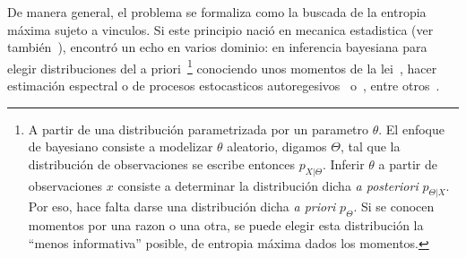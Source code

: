 De  manera general,  el problema  se formaliza  como la  buscada de  la entropia
m\'axima sujeto  a vinculos. Si  este principio naci\'o en  mecanica estadistica
(ver  tambi\'en~\cite{Jay57,  Jay57:2, Jay65}),  encontr\'o  un  echo en  varios
dominio:   en   inferencia   bayesiana   para  elegir   distribuciones   del   a
priori~\footnote{A partir  de una distribuci\'on parametrizada  por un parametro
  $\theta$.  El  enfoque de bayesiano  consiste a modelizar  $\theta$ aleatorio,
  digamos  $\Theta$,  tal que  la  distribuci\'on  de  observaciones se  escribe
  entonces  $p_{X|\Theta}$.   Inferir $\theta$  a  partir  de observaciones  $x$
  consiste   a   determinar  la   distribuci\'on   dicha   {\it  a   posteriori}
  $p_{\Theta|X}$.  Por  eso, hace  falta darse una  distribuci\'on dicha  {\it a
    priori} $p_\Theta$.   Si se conocen  momentos por una  razon o una  otra, se
  puede  elegir esta  distribuci\'on la  ``menos informativa''  posible,  \ie de
  entropia  m\'axima dados  los momentos.\label{foot:SZ:Prior}}  conociendo unos
momentos  de  la  lei~\cite{Rob07,  Jay68,  Jay82,  Csi91},  hacer  estimaci\'on
espectral  o de procesos  estocasticos autoregesivos~\cite{Bur67,  Bur75, Jay82}
o~\cite[cap.~12]{CovTho06}, entre otros~\cite[\& ref.]{KapKes92}.

